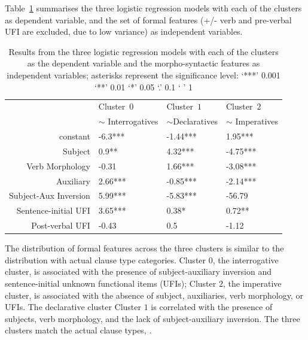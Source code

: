 Table~\ref{tab:target-synstats} summarises the three logistic regression models with each of the clusters as dependent variable, and the set of formal features (+/- verb and pre-verbal UFI are excluded, due to low variance) as independent variables.  
\begin{table}[H]
\begin{center}
\begin{tabular}{r|l|l|l}
\hline
 & Cluster~$0$   & Cluster~$1$   &  Cluster~$2$ \\
 & $\sim$ Interrogatives  & $\sim$Declaratives  & $\sim$ Imperatives \\
 \hline\hline
constant & -6.3*** & -1.44*** & 1.95*** \\
\hline
Subject & 0.9** & 4.32*** & -4.75*** \\
\hline
Verb Morphology & -0.31 & 1.66***  & -3.08*** \\
\hline
Auxiliary & 2.66***  & -0.85*** & -2.14*** \\
\hline
Subject-Aux Inversion &5.99*** & -5.83*** & -56.79 \\
\hline
Sentence-initial UFI & 3.65*** & 0.38* & 0.72** \\
\hline
Post-verbal UFI & -0.43  & 0.5  & -1.12 \\
\hline \hline
\end{tabular}
\end{center}
\caption{Results from the three logistic regression models with each of the clusters as the dependent variable and the morpho-syntactic features as independent variables; asterisks represent the significance level: ‘***’ 0.001 ‘**’ 0.01 ‘*’ 0.05 ‘.’ 0.1 ‘ ’ 1}
\label{tab:target-synstats}
\end{table}%



The distribution of formal features across the three clusters is similar to the distribution with actual clause type categories. Cluster $0$, the interrogative cluster, is associated with the presence of subject-auxiliary inversion and sentence-initial unknown functional items (UFIs); Cluster $2$, the imperative cluster, is associated with the absence of subject, auxiliaries, verb morphology, or UFIs. The declarative cluster Cluster $1$ is correlated with the presence of subjects, verb morphology, and the lack of subject-auxiliary inversion. The three clusters match the actual clause types, \diis.

